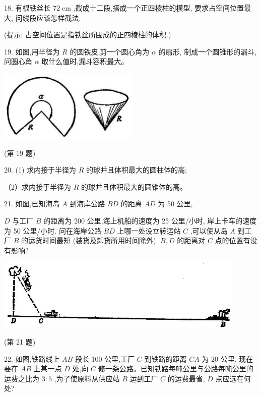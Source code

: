 \documentclass[10pt]{article}
\begin{document}
18. 有根铁丝长 \({72}\mathrm{\;{cm}}\) ,截成十二段,搭成一个正四棱柱的模型, 要求占空间位置最大, 问线段应该怎样截法.

(提示: 占空间位置是指铁丝所围成的正四棱柱的体积.)

19. 如图,用半径为 \(R\) 的圆铁皮,剪一个圆心角为 \(\alpha\) 的扇形, 制成一个圆锥形的漏斗,问圆心角 \(\alpha\) 取什么值时,漏斗容积最大。

\begin{center}
\includegraphics[max width=0.5\textwidth]{images/01912c18-5c3f-733d-b775-749ba9897a9d_157_936491.jpg}
\end{center}

(第 19 题)

20. (1) 求内接于半径为 \(R\) 的球并且体积最大的圆柱体的高;

（2）求内接于半径为 \(R\) 的球并且体积最大的圆锥体的高。

21. 如图,已知海岛 \(A\) 到海岸公路 \({BD}\) 的距离 \({AD}\) 为 50 公里,

\(D\) 与工厂 \(B\) 的距离为 200 公里,海上机船的速度为 25 公里/小时, 岸上卡车的速度为 50 公里/小时. 问在海岸公路 \({BD}\) 上哪一处设立转运站 \(C\) ,可以使从岛 \(A\) 到工厂 \(B\) 的运货时间最短 (装货及卸货所用时间除外). \(B,D\) 的距离对 \(C\) 点的位置有没有影响?

\begin{center}
\includegraphics[max width=0.9\textwidth]{images/01912c18-5c3f-733d-b775-749ba9897a9d_158_569376.jpg}
\end{center}

(第 21 题)

22. 如图,铁路线上 \({AB}\) 段长 100 公里,工厂 \(C\) 到铁路的距离 \({CA}\) 为 20 公里. 现在要在 \({AB}\) 上某一点 \(D\) 处,向 \(C\) 修一条公路。已知铁路每吨公里与公路每吨公里的运费之比为 \(3 : 5\) ,为了使原料从供应站 \(B\) 运到工厂 \(C\) 的运费最省, \(D\) 点应选在何处?
\end{document}
